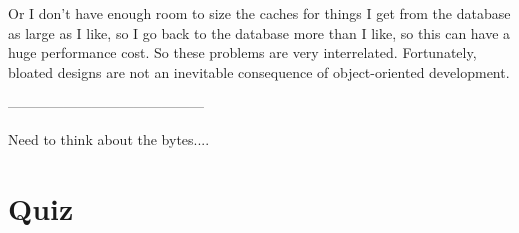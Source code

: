 Or I don't have enough room to size the caches for things I get from the database as large as I like, so I go back to the database more than I like, so this can have a huge performance cost. So these problems are very interrelated.
Fortunately, bloated designs are not an inevitable consequence of object-oriented development.

------------------------------------------

Need to think about the bytes....


\section{Quiz}

